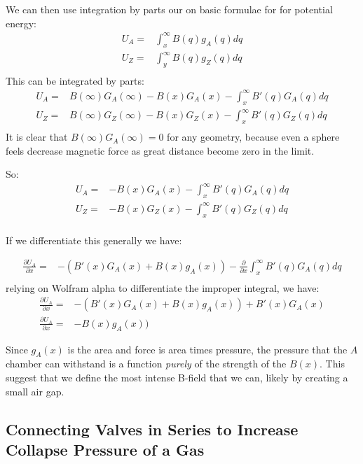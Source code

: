 \documentclass{asme2ej}
\begin{document}
We can then use integration by parts our on basic formulae for
for potential energy:
\begin{align}
  U_A = &\int_x^\infty B(q) g_A(q) dq \\
  U_Z = & \int_y^\infty B(q) g_Z(q) dq \\
\end{align}
This can be integrated by parts:
\begin{align}
  U_A = & B(\infty) G_A(\infty) - B(x) G_A(x) - \int_x^\infty B'(q) G_A(q) dq \\
  U_Z = & B(\infty) G_Z(\infty) - B(x) G_Z(x) - \int_x^\infty B'(q) G_Z(q) dq \\
\end{align}
It is clear that $B(\infty) G_A(\infty) = 0$ for any geometry, because even a
sphere feels decrease magnetic force as great distance become zero in the limit.

So:
\begin{align}
  U_A = & - B(x) G_A(x) - \int_x^\infty B'(q) G_A(q) dq \\
  U_Z = & - B(x) G_Z(x) - \int_x^\infty B'(q) G_Z(q) dq \\
\end{align}

If we differentiate this generally we have:

\begin{align}
  \frac{\partial U_A}{\partial x}= & - (B'(x) G_A(x) + B(x) g_A(x ))  -  \frac{\partial }{\partial x}\int_x^\infty B'(q) G_A(q) dq \\
\end{align}
relying on Wolfram alpha to differentiate the improper integral, we have:
\begin{align}
  \frac{\partial U_A}{\partial x}= & - (B'(x) G_A(x) + B(x) g_A(x ))  +  B'(x) G_A(x) \\
  \frac{\partial U_A}{\partial x}= &  - B(x) g_A(x ))
\end{align}

Since $g_A(x)$ is the area and force is area times pressure, the pressure that the $A$ chamber
can withstand is a function {\em purely} of the strength of the $B(x)$. This suggest that we
define the most intense B-field that we can, likely by creating a small air gap.

\subsection{ Connecting Valves in Series to Increase Collapse Pressure of a Gas}
\end{document}
